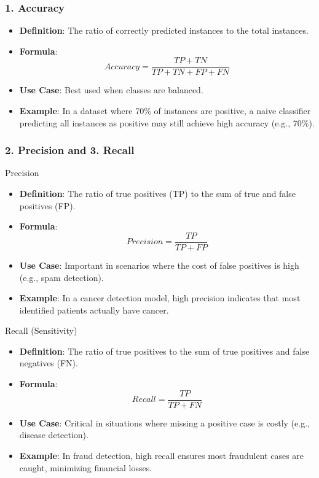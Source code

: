 \documentclass[aspectratio=169]{beamer}
\begin{document}
\begin{frame}[fragile]
    \frametitle{1. Accuracy}
    \begin{itemize}
        \item \textbf{Definition}: The ratio of correctly predicted instances to the total instances.
        \item \textbf{Formula}:
        \begin{equation}
            Accuracy = \frac{TP + TN}{TP + TN + FP + FN}
        \end{equation}
        \item \textbf{Use Case}: Best used when classes are balanced.
        \item \textbf{Example}: In a dataset where 70\% of instances are positive, a naive classifier predicting all instances as positive may still achieve high accuracy (e.g., 70\%).
    \end{itemize}
\end{frame}

\begin{frame}[fragile]
    \frametitle{2. Precision and 3. Recall}
    \begin{block}{Precision}
        \begin{itemize}
            \item \textbf{Definition}: The ratio of true positives (TP) to the sum of true and false positives (FP).
            \item \textbf{Formula}:
            \begin{equation}
                Precision = \frac{TP}{TP + FP}
            \end{equation}
            \item \textbf{Use Case}: Important in scenarios where the cost of false positives is high (e.g., spam detection).
            \item \textbf{Example}: In a cancer detection model, high precision indicates that most identified patients actually have cancer.
        \end{itemize}
    \end{block}
    
    \begin{block}{Recall (Sensitivity)}
        \begin{itemize}
            \item \textbf{Definition}: The ratio of true positives to the sum of true positives and false negatives (FN).
            \item \textbf{Formula}:
            \begin{equation}
                Recall = \frac{TP}{TP + FN}
            \end{equation}
            \item \textbf{Use Case}: Critical in situations where missing a positive case is costly (e.g., disease detection).
            \item \textbf{Example}: In fraud detection, high recall ensures most fraudulent cases are caught, minimizing financial losses.
        \end{itemize}
    \end{block}
\end{frame}
\end{document}
